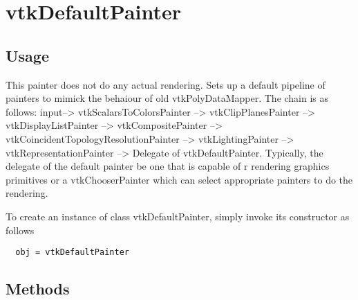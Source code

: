 \section{vtkDefaultPainter}

\subsection{Usage}

 This painter does not do any actual rendering.
 Sets up a default pipeline of painters to mimick the behaiour of 
 old vtkPolyDataMapper. The chain is as follows:
 input--> vtkScalarsToColorsPainter --> vtkClipPlanesPainter -->
 vtkDisplayListPainter --> vtkCompositePainter -->
 vtkCoincidentTopologyResolutionPainter -->
 vtkLightingPainter --> vtkRepresentationPainter --> 
 Delegate of vtkDefaultPainter.
 Typically, the delegate of the default painter be one that is capable of r
 rendering graphics primitives or a vtkChooserPainter which can select appropriate
 painters to do the rendering.

To create an instance of class vtkDefaultPainter, simply
invoke its constructor as follows
\begin{verbatim}
  obj = vtkDefaultPainter
\end{verbatim}
\subsection{Methods}

